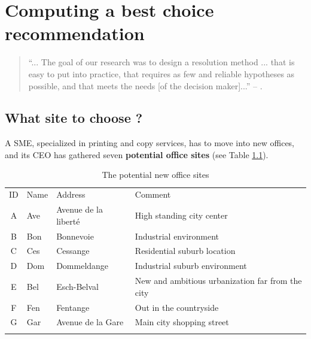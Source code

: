 \chapter{Computing a best choice recommendation}
\label{sec:6}


\begin{quotation}
“... The goal of our research was to design a resolution method ... that is easy to
put into practice, that requires as few and reliable hypotheses as possible, and that
meets the needs [of the decision maker]...” -- \citep*{ROY-1966}.
\end{quotation}

\section{What site to choose ?}
\label{sec:6.1}

A SME, specialized in printing and copy services, has to move into new offices, and its CEO has gathered seven \textbf{potential office sites} (see Table \ref{tab:6.1}).

\begin{table}[h]
\caption{The potential new office sites}
\label{tab:6.1}       %
\begin{center}
    \begin{tabular}{c|l|l|l}
      \svhline\noalign{\smallskip}
      ID & Name & Address & Comment\\
      \noalign{\smallskip}\hline\noalign{\smallskip}
    A &   Ave  &  Avenue de la liberté &  High standing city center\\
    B &   Bon  &  Bonnevoie &             Industrial environment\\
    C &   Ces  &  Cessange &              Residential suburb location\\
    D &   Dom  &  Dommeldange &           Industrial suburb environment\\
    E &   Bel  &  Esch-Belval &           New and ambitious urbanization far from the city\\
    F &   Fen  &  Fentange &              Out in the countryside\\
      G &   Gar  &  Avenue de la Gare &     Main city shopping street\\
      \noalign{\smallskip}\hline
    \end{tabular}
\end{center}
\end{table}

